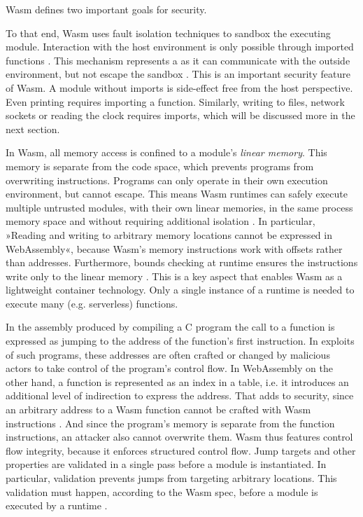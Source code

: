 
Wasm defines two important goals for security.

\begin{quote}
\end{quote}

To that end, Wasm uses fault isolation techniques to sandbox the executing module. Interaction with the host environment is only possible through imported functions \cite{W3C2020}. This mechanism represents a  as it can communicate with the outside environment, but not escape the sandbox \cite{Haas2017}. This is an important security feature of Wasm. A module without imports is side-effect free from the host perspective. Even printing  requires importing a  function. Similarly, writing to files, network sockets or reading the clock requires imports, which will be discussed more in the next section.

In Wasm, all memory access is confined to a module's \emph{linear memory}. This memory is separate from the code space, which prevents programs from overwriting instructions. Programs can only operate in their own execution environment, but cannot escape. This means Wasm runtimes can safely execute multiple untrusted modules, with their own linear memories, in the same process memory space and without requiring additional isolation \cite{Haas2017}. In particular, »Reading and writing to arbitrary memory locations cannot be expressed in WebAssembly«, because Wasm's memory instructions work with offsets rather than addresses. Furthermore, bounds checking at runtime ensures the instructions write only to the linear memory \cite{Denis2019}.
This is a key aspect that enables Wasm as a lightweight container technology. Only a single instance of a runtime is needed to execute many (e.g. serverless) functions.

In the assembly produced by compiling a C program the call to a function is expressed as jumping to the address of the function's first instruction. In exploits of such programs, these addresses are often crafted or changed by malicious actors to take control of the program's control flow. In WebAssembly on the other hand, a function is represented as an index in a table, i.e. it introduces an additional level of indirection to express the address. That adds to security, since an arbitrary address to a Wasm function cannot be crafted with Wasm instructions \cite{Denis2019}. And since the program's memory is separate from the function instructions, an attacker also cannot overwrite them.
Wasm thus features control flow integrity, because it enforces structured control flow. Jump targets and other properties are validated in a single pass before a module is instantiated. In particular, validation prevents jumps from targeting arbitrary locations. This validation must happen, according to the Wasm spec, before a module is executed by a runtime \cite{Haas2017}.


